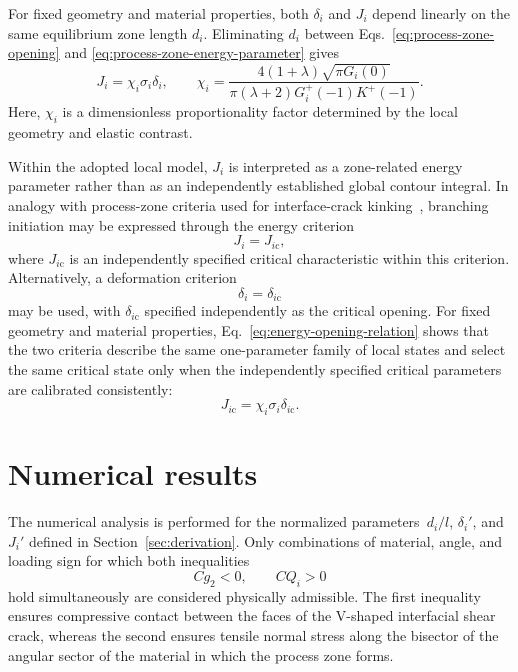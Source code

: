 \documentclass[pdflatex,onecolumn,sn-mathphys-ay]{sn-jnl}
\begin{document}
For fixed geometry and material properties, both $\delta_i$ and $J_i$
depend linearly on the same equilibrium zone length $d_i$. Eliminating
$d_i$ between Eqs.~\eqref{eq:process-zone-opening} and
\eqref{eq:process-zone-energy-parameter} gives
\begin{equation}
\label{eq:energy-opening-relation}
  J_i=\chi_i\sigma_i\delta_i,
  \qquad
  \chi_i=
  \frac{4(1+\lambda)\sqrt{\pi G_i(0)}}
  {\pi(\lambda+2)G_i^+(-1)K^+(-1)}.
\end{equation}
Here, $\chi_i$ is a dimensionless proportionality factor determined by
the local geometry and elastic contrast.

Within the adopted local model, $J_i$ is interpreted as a zone-related
energy parameter rather than as an independently established global contour
integral. In analogy with process-zone criteria used for interface-crack
kinking~\citep{KaminskyEtAl2023}, branching initiation may be expressed
through the energy criterion
\begin{equation*}
  J_i=J_{i\mathrm{c}},
\end{equation*}
where $J_{i\mathrm{c}}$ is an independently specified critical
characteristic within this criterion. Alternatively, a deformation criterion
\begin{equation*}
  \delta_i=\delta_{i\mathrm{c}}
\end{equation*}
may be used, with $\delta_{i\mathrm{c}}$ specified independently as the
critical opening. For fixed geometry and material properties,
Eq.~\eqref{eq:energy-opening-relation} shows that the two criteria
describe the same one-parameter family of local states and select the
same critical state only when the independently specified critical
parameters are calibrated consistently:
\begin{equation*}
  J_{i\mathrm{c}}
  =\chi_i\sigma_i\delta_{i\mathrm{c}}.
\end{equation*}


\section{Numerical results}
\label{sec:numerical-results}

The numerical analysis is performed for the normalized parameters
$\,d_i/l$, $\delta_i'$, and $J_i'$ defined in
Section~\ref{sec:derivation}. Only combinations of material, angle, and
loading sign for which both inequalities
\begin{equation*}
  Cg_2<0,\qquad CQ_i>0
\end{equation*}
hold simultaneously are considered physically admissible. The first
inequality ensures compressive contact between the faces of the V-shaped
interfacial shear crack, whereas the second ensures tensile normal stress
along the bisector of the angular sector of the material in which the
process zone forms.
\end{document}
